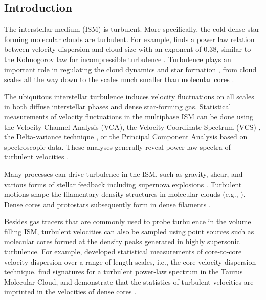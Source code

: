 \subsection{Introduction}
\label{sec:orion-intro} 
\setcounter{footnote}{0} 
The interstellar medium (ISM) is turbulent. More specifically, the cold dense star-forming molecular clouds are turbulent. For example, \citet{larson_turbulence_1981} finds a power law relation between velocity dispersion and cloud size with an exponent of 0.38, similar to the Kolmogorov law for incompressible turbulence \citep{kolmogorov_local_1941}. Turbulence plays an important role in regulating the cloud dynamics and star formation \citep{mac_low_control_2004, mckee_theory_2007,hennebelle_turbulent_2012},
from cloud scales all the way down to the scales much smaller than molecular cores 
\citep{hull_unveiling_2017}.

The ubiquitous interstellar turbulence induces velocity fluctuations on all scales in both diffuse interstellar phases and dense star-forming gas. Statistical measurements of velocity fluctuations in the multiphase ISM can be done using the Velocity Channel Analysis (VCA), the Velocity Coordinate Spectrum (VCS) \citep{lazarian_velocity_2000,lazarian_studying_2006}, the Delta-variance technique \citep{ stutzki_fractal_1998,ossenkopf_turbulent_2002}, or the Principal Component Analysis \citep{ heyer_universality_2004,roman-duval_turbulence_2011} based on spectroscopic data.
These analyses generally reveal power-law spectra of turbulent velocities \citep{ lazarian_obtaining_2009,chepurnov_velocity_2010}.

Many processes can drive turbulence in the ISM, such as gravity, shear, and various forms of stellar feedback including supernova explosions \citep{krumholz_is_2016,padoan_supernova_2016}. Turbulent motions shape the filamentary density structures in molecular clouds (e.g., \citealt{ federrath_universality_2016,xu_formation_2019}). Dense cores and protostars subsequently form in dense filaments \citep{andre_interstellar_2017}.

Besides gas tracers that are commonly used to probe turbulence in the 
volume filling ISM, 
turbulent velocities can also be sampled using point sources 
such as molecular cores formed at the density peaks generated in highly supersonic turbulence. 
For example, \citet{qian_13co_2012} developed statistical measurements of 
core-to-core velocity dispersion over a range of length scales, i.e.,
the core velocity dispersion technique. \citet{qian_studies_2018} find 
signatures for a turbulent power-law spectrum in the Taurus Molecular Cloud, and demonstrate that the statistics of turbulent velocities are imprinted in the velocities of dense cores \citep{xu_projected_2020}. 

